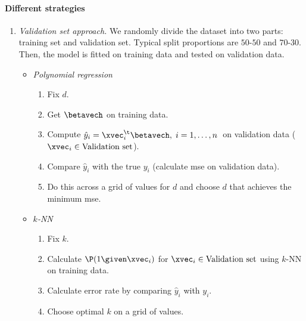 \paragraph{Different strategies}
\begin{enumerate}[beginpenalty=10000]
    \item \emph{Validation set approach.} We randomly divide the dataset into two parts: training set and validation set. Typical split proportions are $50$-$50$ and $70$-$30$. Then, the model is fitted on training data and tested on validation data.
          \begin{examples}\leavevmode
              \begin{itemize}
                  \item \emph{Polynomial regression}
                        \begin{enumerate}
                            \item Fix $d$.
                            \item Get $\betavech$ on training data.
                            \item Compute $\hat{y}_i = \xvec_i^\t\betavech,\; i = 1, \dots, n\;$ on validation data ($\xvec_i \in \text{Validation set}$).
                            \item Compare $\hat{y}_i$ with the true $y_i$ (calculate \acs{mse} on validation data).
                            \item Do this across a grid of values for $d$ and choose $d$ that achieves the minimum \acs{mse}.
                        \end{enumerate}
                  \item \emph{$k$-NN}
                        \begin{enumerate}
                            \item Fix $k$.
                            \item Calculate $\P(1 \given \xvec_i)$ for $\xvec_i \in \text{Validation set}$ using $k$-NN on training data.
                            \item Calculate error rate by comparing $\hat{y}_i$ with $y_i$.
                            \item Choose optimal $k$ on a grid of values.\qedhere
                        \end{enumerate}
              \end{itemize}
          \end{examples}


\end{enumerate}
